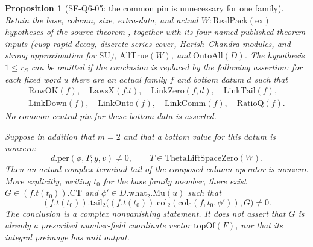 \documentclass[11pt,a4paper]{article}
\newtheorem{proposition}[theorem]{Proposition}
\theoremstyle{definition}
\theoremstyle{remark}
\begin{document}
\begin{proposition}[SF-Q6-05: the common pin is unnecessary for one family]
\label{prop:single-family-m2}
Retain the base, column, size, extra-data, and actual
$W:\mathrm{RealPack}(\mathrm{ex})$ hypotheses of the source theorem
, together with its four named published
theorem inputs (cusp rapid decay, discrete-series cover,
Harish--Chandra modules, and strong approximation for $\mathrm{SU}$),
$\mathrm{AllTrue}(W)$, and $\mathrm{OntoAll}(D)$.
The hypothesis $1\leq r_S$ can be omitted if the conclusion is replaced
by the following assertion: for each fixed word $u$ there are an actual
family $f$ and bottom datum $d$ such that
\[
 \begin{gathered}
 \mathrm{RowOK}(f),\quad \mathrm{LawsX}(f.t),\quad
 \mathrm{LinkZero}(f,d),\quad \mathrm{LinkTail}(f),\\
 \mathrm{LinkDown}(f),\quad \mathrm{LinkOnto}(f),\quad
 \mathrm{LinkComm}(f),\quad \mathrm{RatioQ}(f).
 \end{gathered}
\]
No common central pin for these bottom data is asserted.

Suppose in addition that $m=2$ and that a bottom value for this datum
is nonzero:
\[
 d.\mathrm{per}(\phi,T;y,v)\ne0,
 \qquad T\in\mathrm{ThetaLiftSpaceZero}(W).
\]
Then an actual complex terminal tail of the composed column operator
is nonzero.  More explicitly, writing $t_0$ for the base family member,
there exist $G\in(f.t(t_0)).\mathrm{CT}$ and
$\phi'\in D.\mathrm{what}_2.\mathrm{Mu}(u)$ such that
\[
 (f.t(t_0)).\mathrm{tail}_2
 \bigl((f.t(t_0)).\mathrm{col}_2(\mathrm{col}_0(f,t_0,\phi')),
       G\bigr)\ne0.
\]
The conclusion is a complex nonvanishing statement.  It does not
assert that $G$ is already a prescribed number-field coordinate vector
$\mathrm{topOf}(F)$, nor that its integral preimage has unit output.
\end{proposition}
\end{document}
